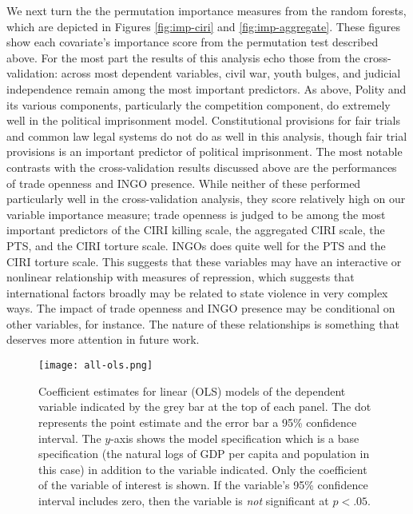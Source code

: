 \documentclass[12pt]{article}
\begin{document}
We next turn the the permutation importance measures from the random forests, which are depicted in Figures \ref{fig:imp-ciri} and \ref{fig:imp-aggregate}. These figures show each covariate's importance score from the permutation test described above. For the most part the results of this analysis echo those from the cross-validation: across most dependent variables, civil war, youth bulges, and judicial independence remain among the most important predictors. As above, Polity and its various components, particularly the competition component, do extremely well in the political imprisonment model. Constitutional provisions for fair trials and common law legal systems do not do as well in this analysis, though fair trial provisions is an important predictor of political imprisonment. The most notable contrasts with the cross-validation results discussed above are the performances of trade openness and INGO presence. While neither of these performed particularly well in the cross-validation analysis, they score relatively high on our variable importance measure; trade openness is judged to be among the most important predictors of the CIRI killing scale, the aggregated CIRI scale, the PTS, and the CIRI torture scale. INGOs does quite well for the PTS and the CIRI torture scale. This suggests that these variables may have an interactive or nonlinear relationship with measures of repression, which suggests that international factors broadly may be related to state violence in very complex ways. The impact of trade openness and INGO presence may be conditional on other variables, for instance. The nature of these relationships is something that deserves more attention in future work.

\begin{figure}[!htpb]
\texttt{[image: all-ols.png]}
\caption{Coefficient estimates for linear (OLS) models of the dependent variable indicated by the grey bar at the top of each panel. The dot represents the point estimate and the error bar a 95\% confidence interval. The $y$-axis shows the model specification which is a base specification (the natural logs of GDP per capita and population in this case) in addition to the variable indicated. Only the coefficient of the variable of interest is shown. If the variable's 95\% confidence interval includes zero, then the variable is \textit{not} significant at $p < .05$.}
\label{fig:all-ols}
\end{figure}
\end{document}
